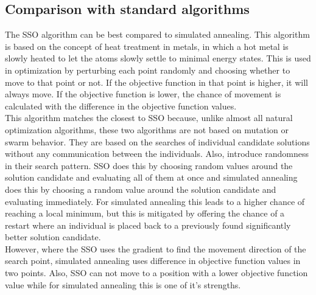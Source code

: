 \documentclass[runningheads]{llncs}
\begin{document}
\subsection{Comparison with standard algorithms}
The SSO algorithm can be best compared to simulated annealing. This algorithm is based on the concept of heat treatment in metals, in which a hot metal is slowly heated to let the atoms slowly settle to minimal energy states. This is used in optimization by perturbing each point randomly and choosing whether to move to that point or not. If the objective function in that point is higher, it will always move. If the objective function is lower, the chance of movement is calculated with the difference in the objective function values.\\
This algorithm matches the closest to SSO because, unlike almost all natural optimization algorithms, these two algorithms are not based on mutation or swarm behavior. They are based on the searches of individual candidate solutions without any communication between the individuals. Also, introduce randomness in their search pattern. SSO does this by choosing random values around the solution candidate and evaluating all of them at once and simulated annealing does this by choosing a random value around the solution candidate and evaluating immediately. For simulated annealing this leads to a higher chance of reaching a local minimum, but this is mitigated by offering the chance of a restart where an individual is placed back to a previously found significantly better solution candidate.\\
However, where the SSO uses the gradient to find the movement direction of the search point, simulated annealing uses difference in objective function values in two points. Also, SSO can not move to a position with a lower objective function value while for simulated annealing this is one of it's strengths.\\


\end{document}
